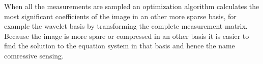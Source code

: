 When all the measurements are sampled an optimization algorithm calculates the most significant coefficients of the image in an other more sparse basis, for example the wavelet basis by transforming the complete measurement matrix. Because the image is more spare or compressed in an other basis it is easier to find the solution to the equation system in that basis and hence the name comressive sensing.    









